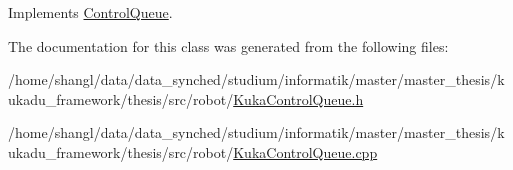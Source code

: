\-Implements \hyperlink{classControlQueue_a37493f41806df96293a95f52f23da280}{\-Control\-Queue}.



\-The documentation for this class was generated from the following files\-:\begin{DoxyCompactItemize}
\item 
/home/shangl/data/data\-\_\-synched/studium/informatik/master/master\-\_\-thesis/kukadu\-\_\-framework/thesis/src/robot/\hyperlink{KukaControlQueue_8h}{\-Kuka\-Control\-Queue.\-h}\item 
/home/shangl/data/data\-\_\-synched/studium/informatik/master/master\-\_\-thesis/kukadu\-\_\-framework/thesis/src/robot/\hyperlink{KukaControlQueue_8cpp}{\-Kuka\-Control\-Queue.\-cpp}\end{DoxyCompactItemize}
